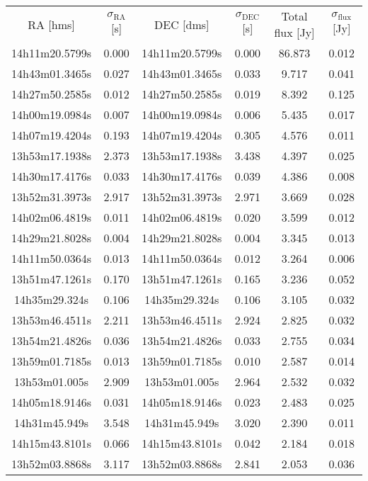 \begin{longtable}[h!]{cccccc}\footnotesize
RA [hms] & $\sigma_\mathrm{RA}$ [s] & DEC [dms] & $\sigma_\mathrm{DEC}$ [s] & Total flux [Jy] & $\sigma_\mathrm{flux}$ [Jy] \\
14h11m20.5799s & 0.000 & 14h11m20.5799s & 0.000 & 86.873 & 0.012 \\
14h43m01.3465s & 0.027 & 14h43m01.3465s & 0.033 & 9.717 & 0.041 \\
14h27m50.2585s & 0.012 & 14h27m50.2585s & 0.019 & 8.392 & 0.125 \\
14h00m19.0984s & 0.007 & 14h00m19.0984s & 0.006 & 5.435 & 0.017 \\
14h07m19.4204s & 0.193 & 14h07m19.4204s & 0.305 & 4.576 & 0.011 \\
13h53m17.1938s & 2.373 & 13h53m17.1938s & 3.438 & 4.397 & 0.025 \\
14h30m17.4176s & 0.033 & 14h30m17.4176s & 0.039 & 4.386 & 0.008 \\
13h52m31.3973s & 2.917 & 13h52m31.3973s & 2.971 & 3.669 & 0.028 \\
14h02m06.4819s & 0.011 & 14h02m06.4819s & 0.020 & 3.599 & 0.012 \\
14h29m21.8028s & 0.004 & 14h29m21.8028s & 0.004 & 3.345 & 0.013 \\
14h11m50.0364s & 0.013 & 14h11m50.0364s & 0.012 & 3.264 & 0.006 \\
13h51m47.1261s & 0.170 & 13h51m47.1261s & 0.165 & 3.236 & 0.052 \\
14h35m29.324s & 0.106 & 14h35m29.324s & 0.106 & 3.105 & 0.032 \\
13h53m46.4511s & 2.211 & 13h53m46.4511s & 2.924 & 2.825 & 0.032 \\
13h54m21.4826s & 0.036 & 13h54m21.4826s & 0.033 & 2.755 & 0.034 \\
13h59m01.7185s & 0.013 & 13h59m01.7185s & 0.010 & 2.587 & 0.014 \\
13h53m01.005s & 2.909 & 13h53m01.005s & 2.964 & 2.532 & 0.032 \\
14h05m18.9146s & 0.031 & 14h05m18.9146s & 0.023 & 2.483 & 0.025 \\
14h31m45.949s & 3.548 & 14h31m45.949s & 3.020 & 2.390 & 0.011 \\
14h15m43.8101s & 0.066 & 14h15m43.8101s & 0.042 & 2.184 & 0.018 \\
13h52m03.8868s & 3.117 & 13h52m03.8868s & 2.841 & 2.053 & 0.036 \\

\end{longtable}
